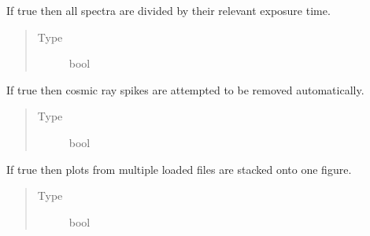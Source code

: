\documentclass[a4paper,10pt,english]{sphinxmanual}
\begin{document}
\begin{fulllineitems}
\begin{fulllineitems}
\begin{quote}
\begin{description}
\end{description}\end{quote}

\end{fulllineitems}


\begin{fulllineitems}
\label{\detokenize{sfgtools:sfgtools.SFGProcessTools.exposure_check}}
\sphinxAtStartPar
If true then all spectra are divided by their relevant exposure time.
\begin{quote}\begin{description}
\item[{Type}] \leavevmode
\sphinxAtStartPar
bool

\end{description}\end{quote}

\end{fulllineitems}


\begin{fulllineitems}
\label{\detokenize{sfgtools:sfgtools.SFGProcessTools.cosmic_kill_check}}
\sphinxAtStartPar
If true then cosmic ray spikes are attempted to be removed automatically.
\begin{quote}\begin{description}
\item[{Type}] \leavevmode
\sphinxAtStartPar
bool

\end{description}\end{quote}

\end{fulllineitems}


\begin{fulllineitems}
\label{\detokenize{sfgtools:sfgtools.SFGProcessTools.stack_plots_check}}
\sphinxAtStartPar
If true then plots from multiple loaded files are stacked onto one figure.
\begin{quote}\begin{description}
\item[{Type}] \leavevmode
\sphinxAtStartPar
bool


\end{description}
\end{quote}
\end{fulllineitems}
\end{fulllineitems}
\end{document}
